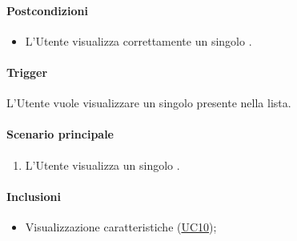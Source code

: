 \paragraph*{Postcondizioni}
\begin{itemize}
  \item L'Utente visualizza correttamente un singolo .
\end{itemize}

\paragraph*{Trigger}
L'Utente vuole visualizzare un singolo  presente nella lista.

\paragraph*{Scenario principale}
\begin{enumerate}
  \item L'Utente visualizza un singolo .
\end{enumerate}

\paragraph*{Inclusioni}
\begin{itemize}
  \item Visualizzazione caratteristiche  (\hyperref[UC10]{UC10});
\end{itemize}
